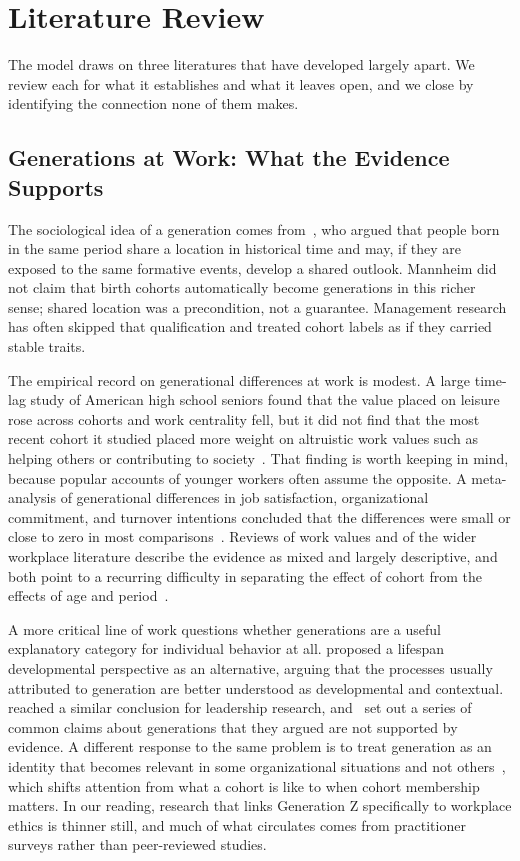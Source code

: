 \documentclass[12pt,a4paper]{article}
\theoremstyle{definition}
\begin{document}
\section{Literature Review}
The model draws on three literatures that have developed largely apart. We review each for what it establishes and what it leaves open, and we close by identifying the connection none of them makes.

\subsection{Generations at Work: What the Evidence Supports}

The sociological idea of a generation comes from~\citet{mannheim1952problem}, who argued that people born in the same period share a location in historical time and may, if they are exposed to the same formative events, develop a shared outlook. Mannheim did not claim that birth cohorts automatically become generations in this richer sense; shared location was a precondition, not a guarantee. Management research has often skipped that qualification and treated cohort labels as if they carried stable traits.

The empirical record on generational differences at work is modest. A large time-lag study of American high school seniors found that the value placed on leisure rose across cohorts and work centrality fell, but it did not find that the most recent cohort it studied placed more weight on altruistic work values such as helping others or contributing to society~\citep{twenge2010generational}. That finding is worth keeping in mind, because popular accounts of younger workers often assume the opposite. A meta-analysis of generational differences in job satisfaction, organizational commitment, and turnover intentions concluded that the differences were small or close to zero in most comparisons~\citep{costanza2012generational}. Reviews of work values and of the wider workplace literature describe the evidence as mixed and largely descriptive, and both point to a recurring difficulty in separating the effect of cohort from the effects of age and period~\citep{parry2011generational,lyons2014generational}.

A more critical line of work questions whether generations are a useful explanatory category for individual behavior at all. \citet{rudolph2017considering} proposed a lifespan developmental perspective as an alternative, arguing that the processes usually attributed to generation are better understood as developmental and contextual. \citet{rudolph2018leadership} reached a similar conclusion for leadership research, and~\citet{rudolph2021generations} set out a series of common claims about generations that they argued are not supported by evidence. A different response to the same problem is to treat generation as an identity that becomes relevant in some organizational situations and not others~\citep{joshi2010unpacking}, which shifts attention from what a cohort is like to when cohort membership matters. In our reading, research that links Generation Z specifically to workplace ethics is thinner still, and much of what circulates comes from practitioner surveys rather than peer-reviewed studies.
\end{document}
